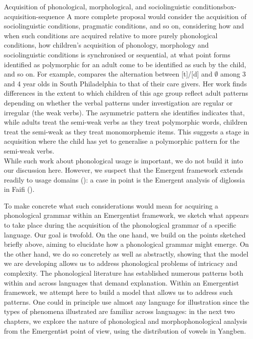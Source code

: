 \begin{dadpbox}{Acquisition of phonological, morphological, and sociolinguistic conditions}{box-acquisition-sequence}
A more complete proposal would consider the acquisition of sociolinguistic conditions, pragmatic conditions, and so on, considering how and when such conditions are acquired relative to more purely phonological conditions, how children's acquisition of phonology, morphology and sociolinguistic conditions is synchronised or sequential, at what point forms identified as polymorphic for an adult come to be identified as such by the child, and so on. For example, \citet{Roberts:1994, Roberts:1997} compares the alternation between [t]/[d] and $\emptyset$ among 3 and 4 year olds in South Philadelphia to that of their care givers. Her work finds differences in the extent to which children of this age group reflect adult patterns depending on whether the verbal patterns under investigation are regular or irregular (the weak verbs).  The asymmetric pattern she identifies indicates that, while adults  treat the semi-weak verbs as they treat polymorphic words, children treat the semi-weak as they treat monomorphemic items. This suggests a stage in acquisition where the child has yet to generalise a polymorphic pattern for the semi-weak verbs.\\

While such work about phonological usage is important, we do not build it into our discussion here. However, we suspect that the Emergent framework extends readily to usage domains (\citealt{vandeWeijer:2012}): a case in point is the Emergent analysis of diglossia in Faifi (\citealt{Alfaifi:2020-SAL, Alfaifi:2020phd}).
\end{dadpbox}


To make concrete what such considerations would mean for acquiring a phonological grammar within an Emergentist framework,  we sketch what appears to take place during the acquisition of the phonological grammar of a specific language.  Our goal is twofold. On the one hand, we build on the points sketched briefly above, aiming to elucidate how a phonological grammar might emerge. On the other hand, we do so concretely as well as abstractly, showing that the model we are developing allows us to address phonological problems of intricacy and complexity. The phonological literature has established numerous patterns both within and across languages that demand explanation. Within an Emergentist framework, we attempt here to build a model that allows us to address such patterns. One could in principle use almost any language for illustration since the types of phenomena illustrated are familiar across languages: in the next two chapters, we explore the nature of phonological and morphophonological analysis from the Emergentist point of view, using the distribution of vowels in Yangben.
